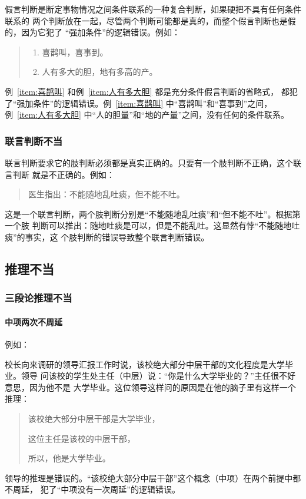 \documentclass[final,oneside]{ctexbook}
\newenvironment{equotation}{\begin{quotation}\kaishu}{\end{quotation}}
\newenvironment{equote}{\begin{quote}\kaishu}{\end{quote}}
\begin{document}
假言判断是断定事物情况之间条件联系的一种复合判断，如果硬把不具有任何条件联系的
两个判断放在一起，尽管两个判断可能都是真的，而整个假言判断也是假的，因为它犯了
“强加条件”的逻辑错误。例如：
\begin{equote}
  \begin{enumerate}
    \item \label{item:喜鹊叫} 喜鹊叫，喜事到。
    \item \label{item:人有多大胆} 人有多大的胆，地有多高的产。
  \end{enumerate}
\end{equote}
例~\ref{item:喜鹊叫} 和例~\ref{item:人有多大胆} 都是充分条件假言判断的省略式，
都犯了“强加条件”的逻辑错误。例~\ref{item:喜鹊叫} 中“喜鹊叫”和“喜事到”之间，
例~\ref{item:人有多大胆} 中“人的胆量”和“地的产量”之间，没有任何的条件联系。

\subsubsection{联言判断不当}

联言判断要求它的肢判断必须都是真实正确的。只要有一个肢判断不正确，这个联言判断
就是不正确的。例如：
\begin{equotation}
  医生指出：不能随地乱吐痰，但不能不吐。
\end{equotation}
这是一个联言判断，两个肢判断分别是“不能随地乱吐痰”和“但不能不吐”。根据第一个肢
判断可以推出：随地吐痰是可以，但是不能乱吐。这显然有悖“不能随地吐痰”的事实，这
个肢判断的错误导致整个联言判断错误。

\subsection{推理不当}

\subsubsection{三段论推理不当}

\paragraph{中项两次不周延}例如：

校长向来调研的领导汇报工作时说，该校绝大部分中层干部的文化程度是大学毕业。领导
问该校的学生处主任（中层）说：“你是什么大学毕业的？”主任很不好意思，因为他不是
大学毕业。这位领导这样问的原因是在他的脑子里有这样一个推理：
\begin{equotation}
  该校绝大部分中层干部是大学毕业，

  这位主任是该校的中层干部，

  所以，他是大学毕业。
\end{equotation}
领导的推理是错误的。“该校绝大部分中层干部”这个概念（中项）在两个前提中都不周延，
犯了“中项没有一次周延”的逻辑错误。
\end{document}
